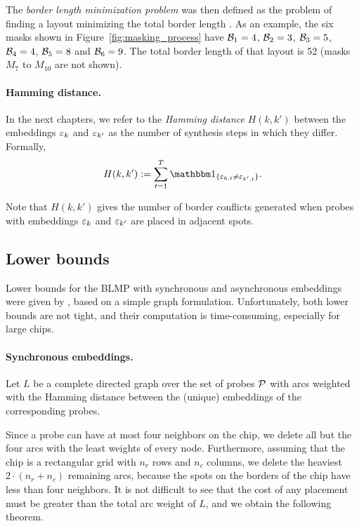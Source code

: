 The \emph{border length minimization problem} was then defined as the problem of
finding a layout minimizing the total border length \citep{Hannenhalli2002}. As
an example, the six masks shown in Figure~\ref{fig:masking_process} have
${\mathcal{B}}_1 = 4$, ${\mathcal{B}}_2 = 3$, ${\mathcal{B}}_3 = 5$, ${\mathcal{B}}_4 = 4$, ${\mathcal{B}}_5 = 8$ and
${\mathcal{B}}_6 = 9$. The total border length of that layout is 52 (masks $M_7$ to
$M_{10}$ are not shown).

\paragraph{Hamming distance.}
In the next chapters, we refer to the \emph{Hamming distance} $H(k,k')$ between
the embeddings $\varepsilon_k$ and $\varepsilon_{k'}$ as the number of synthesis steps in
which they differ. Formally,
\begin{equation}\label{eq:hamming}
  H(k,k') := \sum_{t=1}^{T} \Ind{\eps_{k,t} \neq \eps_{k',t}}.
\end{equation}

Note that $H(k,k')$ gives the number of border conflicts generated when probes
with embeddings $\varepsilon_k$ and $\varepsilon_{k'}$ are placed in adjacent spots.

\subsection{Lower bounds}

Lower bounds for the BLMP with synchronous and asynchronous embeddings were
given by \citet{Kahng2002}, based on a simple graph formulation. Unfortunately,
both lower bounds are not tight, and their computation is time-consuming,
especially for large chips.

\paragraph{Synchronous embeddings.}
Let $L$ be a complete directed graph over the set of probes ${\mathcal{P}}$ with arcs
weighted with the Hamming distance between the (unique) embeddings of the
corresponding probes.

Since a probe can have at most four neighbors on the chip, we delete all but the
four arcs with the least weights of every node. Furthermore, assuming that the
chip is a rectangular grid with $n_r$ rows and $n_c$ columns, we delete the
heaviest $2 \cdot (n_r + n_c)$ remaining arcs, because the spots on the borders
of the chip have less than four neighbors. It is not difficult to see that the
cost of any placement must be greater than the total arc weight of $L$, and we
obtain the following theorem.

